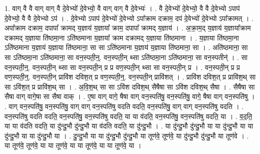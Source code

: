 \documentclass[17pt]{extarticle}
\begin{document}
1. वाग् वै वै वाग् वाग् वै दे॒वेभ्यो॑ दे॒वेभ्यो॒ वै वाग् वाग् वै दे॒वेभ्यः॑ । . वै दे॒वेभ्यो॑ दे॒वेभ्यो॒ वै वै दे॒वेभ्यो ऽपाप॑ दे॒वेभ्यो॒ वै वै दे॒वेभ्यो ऽप॑ । . दे॒वेभ्यो ऽपाप॑ दे॒वेभ्यो॑ दे॒वेभ्यो ऽपा᳚क्राम दक्राम॒ दप॑ दे॒वेभ्यो॑ दे॒वेभ्यो ऽपा᳚क्रामत् । . अपा᳚क्राम दक्राम॒ दपापा᳚ क्रामद् य॒ज्ञाय॑ य॒ज्ञाया᳚ क्राम॒ दपापा᳚ क्रामद् य॒ज्ञाय॑ । . अ॒क्रा॒म॒द् य॒ज्ञाय॑ य॒ज्ञाया᳚क्राम दक्रामद् य॒ज्ञाया ति॑ष्ठमा॒ना ऽति॑ष्ठमाना य॒ज्ञाया᳚ क्राम दक्रामद् य॒ज्ञाया ति॑ष्ठमाना । . य॒ज्ञाया ति॑ष्ठमा॒ना ऽति॑ष्ठमाना य॒ज्ञाय॑ य॒ज्ञाया ति॑ष्ठमाना॒ सा सा ऽति॑ष्ठमाना य॒ज्ञाय॑ य॒ज्ञाया ति॑ष्ठमाना॒ सा । . अति॑ष्ठमाना॒ सा सा ऽति॑ष्ठमा॒ना ऽति॑ष्ठमाना॒ सा वन॒स्पती॒न्॒. वन॒स्पती॒न् थ्सा ऽति॑ष्ठमा॒ना ऽति॑ष्ठमाना॒ सा वन॒स्पतीन्॑ । . सा वन॒स्पती॒न्॒. वन॒स्पती॒न् थ्सा सा वन॒स्पती॒न् प्र प्र वण॒स्पती॒न् थ्सा सा वन॒स्पती॒न् प्र । . वन॒स्पती॒न् प्र प्र वण॒स्पती॒न्॒. वन॒स्पती॒न् प्रावि॑श दविश॒त् प्र वण॒स्पती॒न्॒. वन॒स्पती॒न् प्रावि॑शत् । . प्रावि॑श दविश॒त् प्र प्रावि॑श॒थ् सा सा ऽवि॑श॒त् प्र प्रावि॑श॒थ् सा । . अ॒वि॒श॒थ् सा सा ऽवि॑श दविश॒थ् सैषैषा सा ऽवि॑श दविश॒थ् सैषा । . सैषैषा सा सैषा वाग् वागे॒षा सा सैषा वाक् । . ए॒षा वाग् वागे॒ षैषा वाग् वन॒स्पति॑षु॒ वन॒स्पति॑षु॒ वागे॒ षैषा वाग् वन॒स्पति॑षु । . वाग् वन॒स्पति॑षु॒ वन॒स्पति॑षु॒ वाग् वाग् वन॒स्पति॑षु वदति वदति॒ वन॒स्पति॑षु॒ वाग् वाग् वन॒स्पति॑षु वदति । . वन॒स्पति॑षु वदति वदति॒ वन॒स्पति॑षु॒ वन॒स्पति॑षु वदति॒ या या व॑दति॒ वन॒स्पति॑षु॒ वन॒स्पति॑षु वदति॒ या । . व॒द॒ति॒ या या व॑दति वदति॒ या दु॑न्दु॒भौ दु॑न्दु॒भौ या व॑दति वदति॒ या दु॑न्दु॒भौ । . या दु॑न्दु॒भौ दु॑न्दु॒भौ या या दु॑न्दु॒भौ या या दु॑न्दु॒भौ या या दु॑न्दु॒भौ या । . दु॒न्दु॒भौ या या दु॑न्दु॒भौ दु॑न्दु॒भौ या तूण॑वे॒ तूण॑वे॒ या दु॑न्दु॒भौ दु॑न्दु॒भौ या तूण॑वे । . या तूण॑वे॒ तूण॑वे॒ या या तूण॑वे॒ या या तूण॑वे॒ या या तूण॑वे॒ या । \newline
\end{document}
